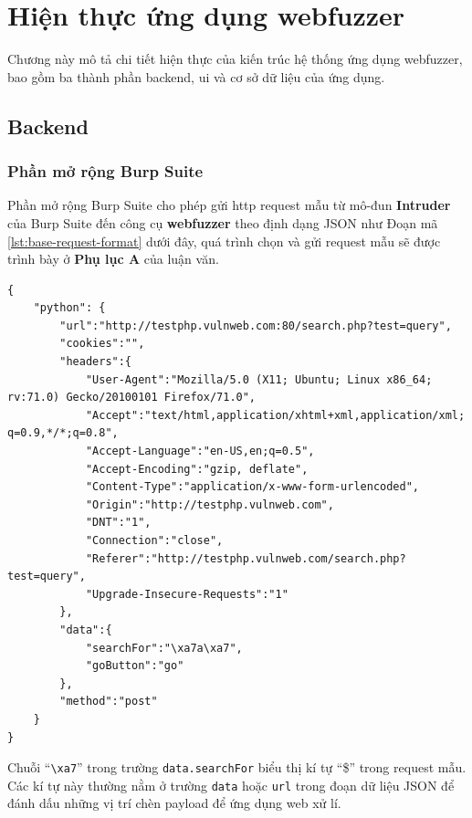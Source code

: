 \chapter{Hiện thực ứng dụng webfuzzer}
Chương này mô tả chi tiết hiện thực của kiến trúc hệ thống ứng dụng webfuzzer, bao gồm ba thành phần backend, \acrshort{ui} và cơ sở dữ liệu của ứng dụng.
\section{Backend}
\subsection{Phần mở rộng Burp Suite}
Phần mở rộng Burp Suite cho phép gửi \acrshort{http} request mẫu từ mô-đun \textbf{Intruder} của Burp Suite đến công cụ \textbf{webfuzzer} theo định dạng JSON như Đoạn mã \ref{lst:base-request-format} dưới đây, quá trình chọn và gửi request mẫu sẽ được trình bày ở \textbf{Phụ lục A} của luận văn.
\begin{lstlisting}[style=ES6, label={lst:base-request-format}, caption={Cấu trúc của một HTTP request mẫu được gửi từ phần mở rộng Burp Suite}]
{
    "python": { 
        "url":"http://testphp.vulnweb.com:80/search.php?test=query",
        "cookies":"",
        "headers":{ 
            "User-Agent":"Mozilla/5.0 (X11; Ubuntu; Linux x86_64; rv:71.0) Gecko/20100101 Firefox/71.0",
            "Accept":"text/html,application/xhtml+xml,application/xml; q=0.9,*/*;q=0.8",
            "Accept-Language":"en-US,en;q=0.5",
            "Accept-Encoding":"gzip, deflate",
            "Content-Type":"application/x-www-form-urlencoded",
            "Origin":"http://testphp.vulnweb.com",
            "DNT":"1",
            "Connection":"close",
            "Referer":"http://testphp.vulnweb.com/search.php?test=query",
            "Upgrade-Insecure-Requests":"1"
        },
        "data":{ 
            "searchFor":"\xa7a\xa7",
            "goButton":"go"
        },
        "method":"post"
    }
}
\end{lstlisting}
Chuỗi ``\texttt{\textbackslash xa7}'' trong trường \texttt{data.searchFor} biểu thị kí tự ``\$'' trong request mẫu. Các kí tự này thường nằm ở trường \texttt{data} hoặc \texttt{url} trong đoạn dữ liệu JSON để đánh dấu những vị trí chèn payload để ứng dụng web xử lí. 

